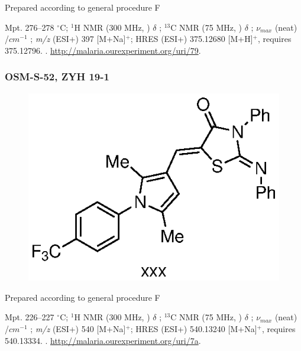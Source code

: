 \documentclass[12pt, a4paper,titlepage]{article}
\begin{document}
{Prepared according to general procedure F

Mpt. 276--278 $^\circ$C; 
$^1$H NMR (300 MHz, ) $\delta$ ; 
  $^{13}$C NMR (75 MHz, ) $\delta$ ; 
 $\nu_{max}$ (neat) /$cm^{-1}$ ; 
\emph{m/z} (ESI+) 397 [M+Na]$^+$; HRES (ESI+) 375.12680 [M+H]$^+$,  requires 375.12796.
. 
\url{http://malaria.ourexperiment.org/uri/79}. 

\subsubsection*{OSM-S-52, ZYH 19-1}
\label{exp:ZYH19}
\begin{figure}[H]
	\begin{center}
	\includegraphics{exp/ZYH19.eps}
	\end{center}
	\vspace{-25pt}	
	\end{figure}

Prepared according to general procedure F

Mpt. 226--227 $^\circ$C; 
$^1$H NMR (300 MHz, ) $\delta$ ; 
  $^{13}$C NMR (75 MHz, ) $\delta$ ; 
 $\nu_{max}$ (neat) /$cm^{-1}$ ; 
\emph{m/z} (ESI+) 540 [M+Na]$^+$; HRES (ESI+) 540.13240 [M+Na]$^+$,  requires 540.13334.
. 
\url{http://malaria.ourexperiment.org/uri/7a}. 

}
\end{document}
